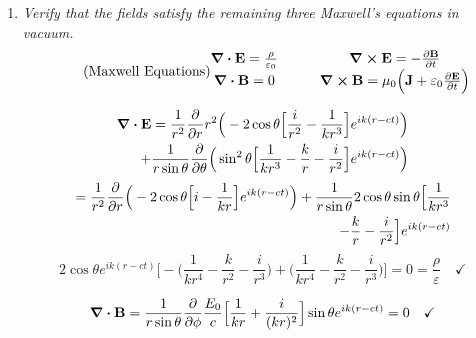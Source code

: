 \documentclass[12pt]{article}
\begin{document}
\begin{enumerate}[label=\alph*)]
\item {\sl Verify that the fields satisfy the remaining three Maxwell's equations in vacuum.}
\begin{equation}
	\tag{Maxwell Equations}
	\mqty{\div{\vb{E}} = \frac{\rho}{\varepsilon_0} & \quad & \curl{\vb{E}} = - \pdv{\vb{B}}{t} \\ \div{\vb{B}} = 0 & \quad & \curl{\vb{B}} = \mu_0\Big(\vb{J} + \varepsilon_0 \pdv{\vb{E}}{t}\Big)}
\end{equation}

\begin{align*}
\div{\vb{E}} = \frac{1}{r^2} \pdv{r} r^2 \Big(-2\cos\theta \Big[\frac{i}{r^2} - \frac{1}{kr^3}\Big]e^{ik(r-ct)}\Big) \\+ \frac{1}{r \sin \theta} \pdv{\theta} \Big(\sin^2\theta \Big[\frac{1}{kr^3}-\frac{k}{r} -\frac{i}{r^2}\Big]e^{ik(r-ct)}\Big)
\end{align*}
\begin{align*}
= \frac{1}{r^2}\pdv{r}\Big(-2\cos\theta \Big[i - \frac{1}{kr}\Big]e^{ik(r-ct)}\Big) + \frac{1}{r\sin\theta}2\cos\theta \sin\theta\Big[\frac{1}{kr^3} \\ - \frac{k}{r} -\frac{i}{r^2}\Big]e^{ik(r-ct)}
\end{align*}
\[2\cos\theta e^{ik(r-ct)}\Big[-\Big(\frac{1}{kr^4} -\frac{k}{r^2} -\frac{i}{r^3}\Big) + \Big(\frac{1}{kr^4}-\frac{k}{r^2} -\frac{i}{r^3}\Big)\Big] = 0 = \frac{\rho}{\varepsilon} \quad \checkmark\]\bigskip

\[\div{\vb{B}} = \frac{1}{r\sin\theta}\pdv{\phi} \frac{E_0}{c}\Big[\frac{1}{kr} + \frac{i}{(kr)^2}\Big]\sin\theta e^{ik(r-ct)} = 0 \quad \checkmark\]\bigskip


\end{enumerate}
\end{document}
